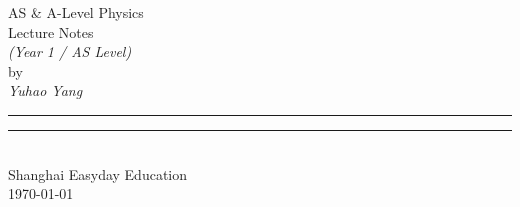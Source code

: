 \NoBgThispage 
\begin{center}
	\vspace*{0.13\textheight}
	{\Huge AS \& A-Level Physics}\\[\baselineskip]
	{\Huge Lecture Notes}\\[1.5\baselineskip]
	{\Huge\itshape (Year 1 / AS Level)}\\[3\baselineskip]
	{\Large\sc by}\\[0.5\baselineskip]
	{\Large \textit{Yuhao Yang}} \\
	\par
	\vfill
	{\color{cyan} \rule{\textwidth}{0.4pt}\vspace*{-\baselineskip}\vspace{3pt}
		\rule{\textwidth}{0.4pt}} \\[\baselineskip]
	{\Large Shanghai Easyday Education} \\[0.5\baselineskip]
	{\Large \today}\par
	\vspace*{0.13\textheight}
\end{center}
